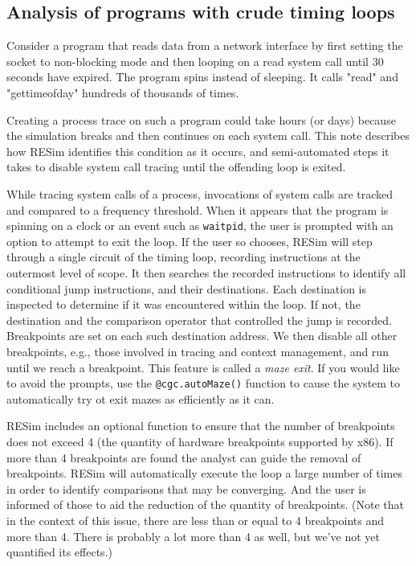 \documentclass[titlepage]{article}
\begin{document}
\begin{appendices}

\section{Analysis of programs with crude timing loops}
\label{maze}
Consider a program that reads data from a network interface by first setting the socket to non-blocking mode and then looping on a read system call until 30 seconds have expired.  The program spins instead of sleeping.  It calls "read" and "gettimeofday" hundreds of thousands of times.

Creating a process trace on such a program could take hours (or days) because the simulation breaks and then continues on each system call.  This note describes how RESim identifies this condition as it occurs, and semi-automated steps it takes to disable system call tracing until the offending loop is exited.  

While tracing system calls of a process, invocations of system calls are tracked and compared to a frequency threshold.  When it appears that the program is spinning on a clock or an event such as {\tt waitpid}, the user is prompted with an option to attempt to exit the loop. If the user so chooses, RESim will step through a single circuit of the timing loop, recording instructions at the outermost level of scope. It then searches the recorded instructions to identify all conditional jump instructions, and their destinations. Each destination is inspected to determine if it was encountered within the loop.  If not, the destination and the comparison operator that controlled the jump is recorded.  Breakpoints are set on each such destination address.  We then disable all other breakpoints, e.g., those involved in tracing and context management, and run until we reach a breakpoint.  
This feature is called a \textit{maze exit}.  If you would like to avoid the prompts, use the {\tt @cgc.autoMaze()} function to cause the system
to automatically try ot exit mazes as efficiently as it can.

RESim includes an optional function to ensure that the number of breakpoints does not exceed 4 (the quantity of hardware breakpoints supported by x86).  If more than 4 breakpoints are found the analyst can guide the removal of breakpoints. RESim will automatically execute the loop a large number of times in order to identify comparisons that may be converging.  And the user is informed of those to aid the reduction of the quantity of breakpoints.  (Note that in the context of this issue, there are less than or equal to 4 breakpoints and more than 4.  There is probably a lot more than 4 as well, but we've not yet quantified its effects.)


\end{appendices}
\end{document}
